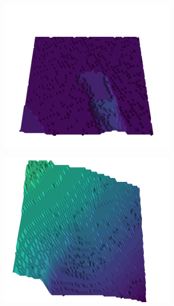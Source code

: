 \begin{figure}[H]
    \begin{subfigure}[b]{0.19\textwidth}
        \includegraphics[width=\linewidth]{../img/5/quarry/false_negative//patch-3d-majavi-colormap-2.png}
    \end{subfigure}
    \begin{subfigure}[b]{0.19\textwidth}
        \includegraphics[width=\linewidth]{../img/5/quarry/false_negative//patch-3d-majavi-colormap-3.png}
    \end{subfigure}  

\end{figure}
